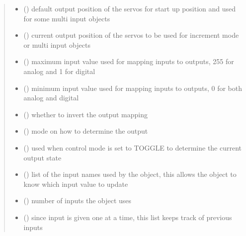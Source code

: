 \documentclass[letterpaper,10pt,english]{sphinxmanual}
\begin{document}
\begin{fulllineitems}
\begin{quote}
\begin{description}
\begin{itemize}
\item {} 
\sphinxAtStartPar
{}(\sphinxstyleemphasis{{[}int{]}}) \textendash{} default output position of 
the servos for start up position and used for some multi input 
objects

\item {} 
\sphinxAtStartPar
{}(\sphinxstyleemphasis{{[}int{]}}) \textendash{} current output position of the 
servos to be used for increment mode or multi input objects

\item {} 
\sphinxAtStartPar
{}() \textendash{} maximum input value used for mapping 
inputs to outputs, 255 for analog and 1 for digital

\item {} 
\sphinxAtStartPar
{}() \textendash{} minimum input value used for mapping 
inputs to outputs, 0 for both analog and digital

\item {} 
\sphinxAtStartPar
{}(\sphinxstyleemphasis{{[}Boolean{]}}) \textendash{} whether to invert the output 
mapping

\item {} 
\sphinxAtStartPar
{}() \textendash{} mode on how to determine 
the output

\item {} 
\sphinxAtStartPar
{}() \textendash{} used when control mode 
is set to TOGGLE to determine the current output state

\item {} 
\sphinxAtStartPar
{}(\sphinxstyleemphasis{{[}str{]}}) \textendash{} list of the input names used by 
the object, this allows the object to know which input value to 
update

\item {} 
\sphinxAtStartPar
{}() \textendash{} number of inputs the object uses

\item {} 
\sphinxAtStartPar
{}(\sphinxstyleemphasis{{[}int{]}}) \textendash{} since input is given one at a 
time, this list keeps track of previous inputs


\end{itemize}
\end{description}
\end{quote}
\end{fulllineitems}
\end{document}
